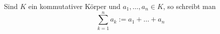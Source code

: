 Sind $K$ ein kommutativer Körper und $a_1, \dots, a_n \in K$, so schreibt man
$$\sum_{k=1}^n a_k := a_1 + \dots + a_n$$